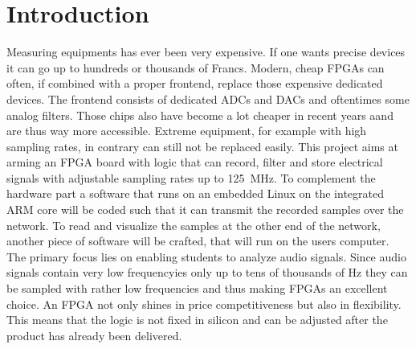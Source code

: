 \chapter*{Introduction} %
\label{ch:intro}


Measuring  equipments  has ever  been  very  expensive. If one  wants  precise
devices it can  go up to hundreds or thousands  of Francs. Modern, cheap FPGAs
can  often,  if combined  with  a  proper  frontend, replace  those  expensive
dedicated  devices.  The  frontend consists  of  dedicated ADCs  and DACs  and
oftentimes some analog filters. Those chips also  have become a lot cheaper in
recent  years aand  are  thus  way more  accessible.   Extreme equipment,  for
example  with high  sampling  rates, in  contrary can  still  not be  replaced
easily.  This project aims at arming an FPGA board with logic that can record,
filter  and store  electrical signals  with  adjustable sampling  rates up  to
\SI{125}{\mega\hertz}. To complement the hardware part a software that runs on
an embedded Linux  on the integrated ARM  core will be coded such  that it can
transmit the  recorded samples over  the network.   To read and  visualize the
samples at  the other end  of the network, another  piece of software  will be
crafted,  that will  run on  the users  computer.  The  primary focus  lies on
enabling students to  analyze audio signals. Since audio  signals contain very
low  frequencyies only  up to  tens of  thousands of  \si{\hertz} they  can be
sampled with rather low frequencies and thus making FPGAs an excellent choice.
An FPGA  not only  shines in  price competitiveness  but also  in flexibility.
This means that  the logic is not  fixed in silicon and can  be adjusted after
the product has already been delivered.

